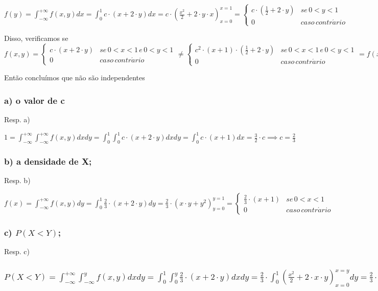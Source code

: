 \documentclass[english]{article}
\begin{document}
$f(y)=\int_{-\infty}^{+\infty}f(x,y)dx=\int_{0}^{1}c\cdot(x+2\cdot y)dx=c\cdot(\frac{x^{2}}{2}+2\cdot y\cdot x)_{x=0}^{x=1}=\begin{cases}
c\cdot(\frac{1}{2}+2\cdot y) & se\,0<y<1\\
0 & caso\, contr\acute{a}rio
\end{cases}$

Disso, verificamos se $f(x,y)=\begin{cases}
c\cdot(x+2\cdot y) & se\,0<x<1\, e\,0<y<1\\
0 & caso\, contr\acute{a}rio
\end{cases}\neq\begin{cases}
c^{2}\cdot(x+1)\cdot(\frac{1}{2}+2\cdot y) & se\,0<x<1\, e\,0<y<1\\
0 & caso\, contr\acute{a}rio
\end{cases}=f(x)\cdot f(y)$

Então concluímos que não são independentes


\subsubsection*{\textmd{a) o valor de c}}

Resp. a)

$1=\int_{-\infty}^{+\infty}\int_{-\infty}^{+\infty}f(x,y)dxdy=\int_{0}^{1}\int_{0}^{1}c\cdot(x+2\cdot y)dxdy=\int_{0}^{1}c\cdot(x+1)dx=\frac{3}{2}\cdot c\implies c=\frac{2}{3}$


\subsubsection*{\textmd{b) a densidade de X; }}

Resp. b)

$f(x)=\int_{-\infty}^{+\infty}f(x,y)dy=\int_{0}^{1}\frac{2}{3}\cdot(x+2\cdot y)dy=\frac{2}{3}\cdot(x\cdot y+y^{2})_{y=0}^{y=1}=\begin{cases}
\frac{2}{3}\cdot(x+1) & se\,0<x<1\\
0 & caso\, contr\acute{a}rio
\end{cases}$


\subsubsection*{\textmd{c) $P(X<Y)$; }}

Resp. c)


\subsubsection*{\textmd{$P(X<Y)=\int_{-\infty}^{+\infty}\int_{-\infty}^{y}f(x,y)dxdy=\int_{0}^{1}\int_{0}^{y}\frac{2}{3}\cdot(x+2\cdot y)dxdy=\frac{2}{3}\cdot\int_{0}^{1}(\frac{x^{2}}{2}+2\cdot x\cdot y)_{x=0}^{x=y}dy=\frac{2}{3}\cdot\int_{0}^{1}\frac{5}{2}\cdot y^{2}dy=\frac{5}{3}\cdot\frac{y^{3}}{3}_{y=0}^{y=1}=\frac{5}{9}$}}
\end{document}
